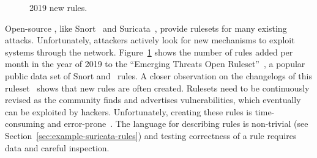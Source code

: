 \documentclass[conference]{IEEEtran}
\begin{document}
\begin{figure}
    \vspace{-4ex}  
    \centering
    \vspace{-5ex}
    \caption{\label{fig:distribution-rules-per-month}2019 new rules.}
\end{figure}
Open-source \nids{}, like Snort~\cite{snort} and
Suricata~\cite{suricata}, provide rulesets for many existing
attacks. Unfortunately, attackers actively look for new mechanisms to
exploit systems through the
network. Figure~\ref{fig:distribution-rules-per-month} shows the
number of rules added per month in the year of 2019 to the ``Emerging
Threats Open Ruleset''~\cite{emerging-threats-open}, a popular public
data set of Snort and \suri\ rules. A closer observation on the changelogs of
this ruleset~\cite{emerging-threats-changelogs} shows that new rules
are often created.  Rulesets need to be continuously revised as the
community finds and advertises vulnerabilities, which eventually can
be exploited by hackers.  Unfortunately, creating these rules is
time-consuming and error-prone~\cite{vollmer-etal-cics2011,alparslan-blog-suri}. The language for
describing rules is non-trivial (see
Section~\ref{sec:example-suricata-rules}) and testing correctness of a
rule requires data and careful inspection.

\end{document}
